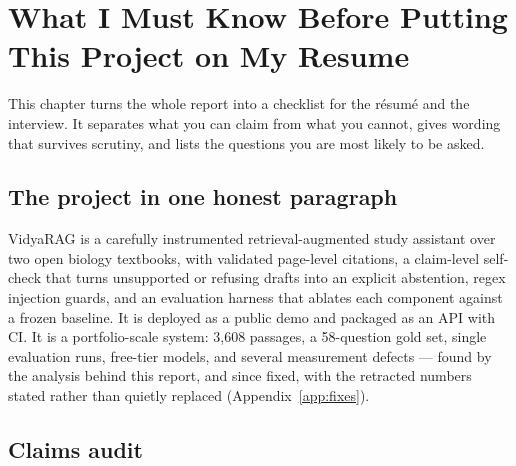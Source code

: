 \chapter{What I Must Know Before Putting This Project on My Resume}
\label{ch:resume}

This chapter turns the whole report into a checklist for the résumé and the interview. It separates what you can claim from what you cannot, gives wording that survives scrutiny, and lists the questions you are most likely to be asked.

\section{The project in one honest paragraph}

VidyaRAG is a carefully instrumented retrieval-augmented study assistant over two open biology textbooks, with validated page-level citations, a claim-level self-check that turns unsupported or refusing drafts into an explicit abstention, regex injection guards, and an evaluation harness that ablates each component against a frozen baseline. It is deployed as a public demo and packaged as an API with CI. It is a portfolio-scale system: 3,608 passages, a 58-question gold set, single evaluation runs, free-tier models, and several measurement defects --- found by the analysis behind this report, and since fixed, with the retracted numbers stated rather than quietly replaced (Appendix~\ref{app:fixes}).

\section{Claims audit}

